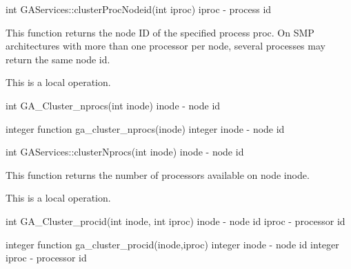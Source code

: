 \documentclass[12pt]{article}
\begin{document}
\begin{cxxapi}
int GAServices::clusterProcNodeid(int iproc)
   iproc      - process id                                                 \access{[input]}
\end{cxxapi}

\begin{desc}

This function returns the node ID of the specified process proc. On SMP architectures with more than one processor per node, several processes may return the same node id.

This is a  local operation.
\end{desc}


\begin{capi}
int GA_Cluster_nprocs(int inode)
   inode       - node id                                                   \access{[input]}
\end{capi}

\begin{fapi}
integer function ga_cluster_nprocs(inode)
   integer inode  - node id                                                \access{[input]} 
\end{fapi}

\begin{cxxapi}
int GAServices::clusterNprocs(int inode)
   inode       - node id                                                   \access{[input]}
\end{cxxapi}

\begin{desc}

This function returns the number of processors available on node inode.

This is a local operation.
\end{desc}


\begin{capi}
int GA_Cluster_procid(int inode, int iproc)
   inode       - node id                                                   \access{[input]}
   iproc       - processor id                                              \access{[input]}
\end{capi}

\begin{fapi}
integer function ga_cluster_procid(inode,iproc)
   integer inode   - node id                                               \access{[input]}
   integer iproc   - processor id                                          \access{[input]}
\end{fapi}
\end{document}
